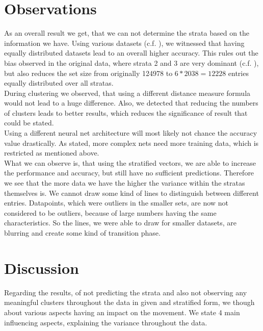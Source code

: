 \documentclass[runningheads]{llncs}
\begin{document}
	\section{Observations} \label{sec: observation}
	As an overall result we get, that we can not determine the strata based on the information we have.
	Using various datasets (c.f. ), we witnessed that having equally distributed datasets lead to an overall higher accuracy. This rules out the bias observed in the original data, where strata 2 and 3 are very dominant (c.f. ), but also reduces the set size from originally 124978 to $6*2038=12228$ entries equally distributed over all stratas.\\
	During clustering we observed, that using a different distance measure formula would not lead to a huge difference. Also, we detected that reducing the numbers of clusters leads to better results, which reduces the significance of result that could be stated.\\
	Using a different neural net architecture will most likely not chance the accuracy value drastically. As stated, more complex nets need more training data, which is restricted as mentioned above.\\
	What we can observe is, that using the stratified vectors, we are able to increase the performance and accuracy, but still have no sufficient predictions. Therefore we see that the more data we have the higher the variance within the stratas themselves is. We cannot draw some kind of lines to distinguish between different entries. Datapoints, which were outliers in the smaller sets, are now not considered to be outliers, because of large numbers having the same characteristics. So the lines, we were able to draw for smaller datasets, are blurring and create some kind of transition phase.\\ %
	
	
	\section{Discussion} \label{sec: discussion}
	Regarding the results, of not predicting the strata and also not observing any meaningful clusters throughout the data in given and stratified form, we though about various aspects having an impact on the movement. We state 4 main influencing aspects, explaining the variance throughout the data.
	
\end{document}
